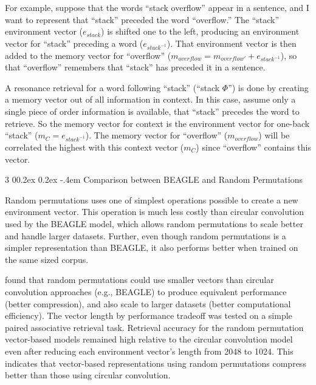 \documentclass[man,floatsintext,donotrepeattitle]{apa6}
\makeatletter
\renewcommand{\subsubsection}{%
  \@startsection
  {subsubsection}%
  {3}%
  {\parindent}%
  {0\baselineskip \@plus 0.2ex \@minus 0.2ex}%
  {-.4em}%
  {\normalfont\normalsize\bfseries\addperi}}
\makeatother
\begin{document}
For example, suppose that the words ``stack overflow'' appear in a sentence, and I want to represent that ``stack'' preceded the word ``overflow.''
The ``stack'' environment vector ($e_{stack}$) is shifted one to the left, producing an environment vector for ``stack'' preceding a word ($e_{stack^{-1}}$).
That environment vector is then added to the memory vector for ``overflow'' ($m_{overflow} = m_{overflow'} + e_{stack^{-1}}$), so that ``overflow'' remembers that ``stack'' has preceded it in a sentence.

A resonance retrieval for a word following ``stack'' (``stack $\Phi$'') is done by creating a memory vector out of all information in context.
In this case, assume only a single piece of order information is available, that ``stack'' precedes the word to retrieve.
So the memory vector for context is the environment vector for one-back ``stack'' ($m_{C} = e_{stack^{-1}}$).
The memory vector for ``overflow'' ($m_{overflow}$) will be correlated the highest with this context vector ($m_{C}$) since ``overflow'' contains this vector.

\subsubsection{Comparison between BEAGLE and Random Permutations}

Random permutations uses one of simplest operations possible to create a new environment vector.
This operation is much less costly than circular convolution used by the BEAGLE model, which allows random permutations to scale better and handle larger datasets.
Further, even though random permutations is a simpler representation than BEAGLE, it also performs better when trained on the same sized corpus. 

\textcite{Recchia2010} found that random permutations could use smaller vectors than circular convolution approaches (e.g., BEAGLE) to produce equivalent performance (better compression),
and also scale to larger datasets (better computational efficiency).
The vector length by performance tradeoff was tested on a simple paired associative retrieval task. 
Retrieval accuracy for the random permutation vector-based models remained high relative to the circular convolution model even after reducing each environment vector's length from \num{2048} to \num{1024}.
This indicates that vector-based representations using random permutations compress better than those using circular convolution.
\end{document}
